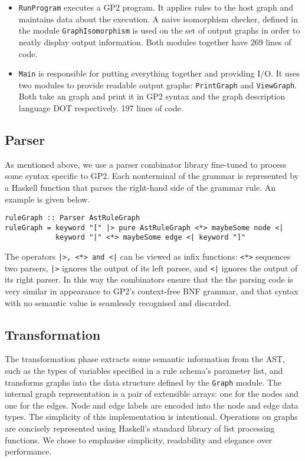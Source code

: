 \begin{itemize}
\item \texttt{RunProgram} executes a GP2 program. It applies rules to the host graph and maintains data about the execution. A naive isomorphism checker, defined in the module \texttt{GraphIsomorphism} is used on the set of output graphs in order to neatly display output information. Both modules together have 269 lines of code.
\item \texttt{Main} is responsible for putting everything together and providing I/O. It uses two modules to provide readable output graphs: \texttt{PrintGraph} and \texttt{ViewGraph}. Both take an graph and print it in GP2 syntax and the graph description language DOT respectively. 197 lines of code.
\end{itemize}

\subsection{Parser}

As mentioned above, we use a parser combinator library fine-tuned to process some syntax specific to GP2. Each nonterminal of the grammar is represented by a Haskell function that parses the right-hand side of the grammar rule. An example is given below.

\begin{verbatim}
ruleGraph :: Parser AstRuleGraph
ruleGraph = keyword "[" |> pure AstRuleGraph <*> maybeSome node <| 
            keyword "|" <*> maybeSome edge <| keyword "]"
\end{verbatim}

The operators \texttt{|>, <*> and <|} can be viewed as infix functions: \texttt{<*>} sequences two parsers, \texttt{|>} ignores the output of its left parsee, and \texttt{<|} ignores the output of its right parser. In this way the combinators ensure that the the parsing code is very similar in appearance to GP2's context-free BNF grammar, and that syntax with no semantic value is seamlessly recognised and discarded.

\subsection{Transformation}

The transformation phase extracts some semantic information from the AST, such as the types of variables specified in a rule schema's parameter list, and transforms graphs into the data structure defined by the \texttt{Graph} module. The internal graph representation is a pair of extensible arrays: one for the nodes and one for the edges. Node and edge labels are encoded into the node and edge data types. The simplicity of this implementation is intentional. Operations on graphs are concisely represented using Haskell's standard library of list processing functions. We chose to emphasise simplicity, readability and elegance over performance. 

